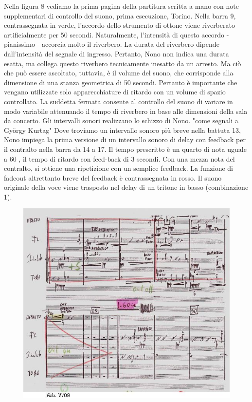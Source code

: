 Nella figura 8 vediamo la prima pagina della partitura scritta a mano con note supplementari di controllo del suono, prima esecuzione, Torino. Nella barra 9, contrassegnata in verde, l'accordo dello strumento di ottone viene riverberato artificialmente per 50 secondi. Naturalmente, l'intensità di questo accordo - pianissimo - accorcia molto il riverbero. La durata del riverbero dipende dall'intensità del segnale di ingresso. Pertanto, Nono non indica una durata esatta, ma collega questo riverbero tecnicamente inesatto da un arresto. Ma ciò che può essere ascoltato, tuttavia, è il volume del suono, che corrisponde alla dimensione di una stanza geometrica di 50 secondi. Pertanto è importante che vengano utilizzate solo apparecchiature di ritardo con un volume di spazio controllato. La suddetta fermata consente al controllo del suono di variare in modo variabile attenuando il tempo di riverbero in base alle dimensioni della sala da concerto. Gli intervalli sonori realizzano lo schizzo di Nono. "come segnali a György Kurtag" Dove troviamo un intervallo sonoro più breve nella battuta 13, Nono impiega la prima versione di un intervallo sonoro di delay con feedback per il contralto nella barra da 14 a 17. Il tempo prescritto è un quarto di nota uguale a 60 , il tempo di ritardo con feed-back di 3 secondi. Con una mezza nota del contralto, si ottiene una ripetizione con un semplice feedback. La funzione di fadeout altrettanto breve del feedback è contrassegnata in rosso. Il suono originale della voce viene trasposto nel delay di un tritone in basso (combinazione 1).

\begin{figure}[htbp]
\begin{center}
\includegraphics[width=1\textwidth]{images/nono/hph/ab_v_09.jpg}
\caption{}
\label{hph-img9}
\end{center}
\end{figure}


